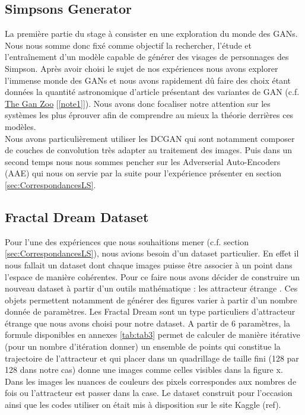 \documentclass[11pt,francais]{article}
\begin{document}
\subsection{Simpsons Generator}
\label{sec:SimpsonsGenerator}
La première partie du stage à consister en une exploration du monde des GANs. Nous nous somme donc fixé comme objectif la rechercher, l'étude et l'entraînement d'un modèle capable de générer des visages de personnages des Simpson.
Après avoir choisi le sujet de nos expériences nous avons explorer l'immense monde des GANs et nous avons rapidement dû faire des choix étant données la quantité astronomique d'article présentant des variantes de GAN (c.f. \href{https://github.com/hindupuravinash/the-gan-zoo}{The Gan Zoo} [\ref{note1}]).
Nous avons donc focaliser notre attention sur les systèmes les plus éprouver afin de comprendre au mieux la théorie derrières ces modèles.\\
Nous avons particulièrement utiliser les DCGAN \cite{radford2015unsupervised} qui sont notamment composer de couches de convolution très adapter au traitement des images. Puis dans un second temps nous nous sommes pencher sur les Adverserial Auto-Encoders (AAE)  qui nous on servie par la suite pour l'expérience présenter en section \ref{sec:CorrespondancesLS}.

\subsection{Fractal Dream Dataset}
\label{sec:FDD}
Pour l'une des expériences que nous souhaitions mener (c.f. section \ref{sec:CorrespondancesLS}), nous avions besoin d'un dataset particulier.
En effet il nous fallait un dataset dont chaque images puisse être associer à un point dans l'espace de manière cohérentes.
Pour ce faire nous avons décider de construire un nouveau dataset à partir d'un outils mathématique : les attracteur étrange \cite{Pickover}. Ces objets permettent notamment de générer des figures varier à partir d'un nombre donnée de paramètres.
Les Fractal Dream \cite{Pickover} sont un type particuliers d'attracteur étrange que nous avons choisi pour notre dataset. A partir de 6 paramètres, la formule disponibles en annexes \ref{tab:tab3} permet de calculer de manière itérative (pour un nombre d'itération donner) un ensemble de points qui constitue la trajectoire de l'attracteur et qui placer dans un quadrillage de taille fini (128 par 128 dans notre cas) donne une images comme celles visibles dans la figure x. Dans les images les nuances de couleurs des pixels correspondes aux nombres de fois ou l'attracteur est passer dans la case.
Le dataset construit pour l'occasion ainsi que les codes utiliser on était mis à disposition sur le site Kaggle (ref).
\end{document}
